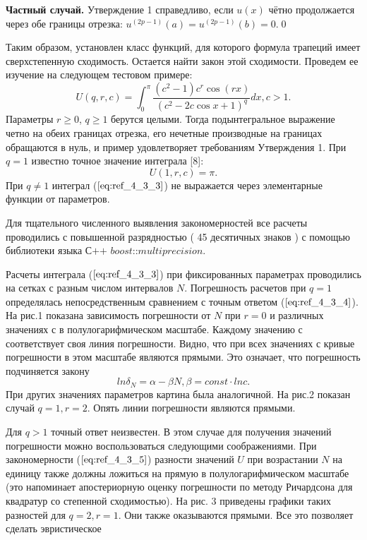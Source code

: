 \textbf{Частный случай.} Утверждение 1 справедливо, если $u(x)$ чётно
продолжается через обе границы отрезка: $u^{(2p-1)}(a)=u^{(2p-1)}(b)=0$.\qed

Таким образом, установлен класс функций, для которого формула
трапеций имеет сверхстепенную сходимость. Остается найти закон этой
сходимости. Проведем ее изучение на следующем тестовом примере:
\begin{equation}
U(q,r,c) = \int_0^{\pi} \frac{(c^2-1)c^r\cos (rx)}{(c^2-2c\cos x+1)^q}dx,c>1.
\label{eq:ref_4_3_3}
\end{equation}
Параметры $r \geqslant 0$, $q \geqslant 1$ берутся целыми. Тогда подынтегральное выражение
четно на обеих границах отрезка, его нечетные производные на границах
обращаются в нуль, и пример удовлетворяет требованиям Утверждения 1. При
$q = 1$ известно точное значение интеграла [8]:
\begin{equation}
U(1,r,c) = \pi.
\label{eq:ref_4_3_4}
\end{equation}
При $q \ne 1$ интеграл ($\ref{eq:ref_4_3_3}$) не выражается через элементарные функции от
параметров.

Для тщательного численного выявления закономерностей все расчеты
проводились с повышенной разрядностью ( 45 десятичных знаков ) с помощью
библиотеки языка $\textit{С++ boost::multiprecision}$.

Расчеты интеграла ($\ref{eq:ref_4_3_3}$) при фиксированных параметрах проводились на
сетках с разным числом интервалов $N$. Погрешность расчетов при $q =1$
определялась непосредственным сравнением с точным ответом ($\ref{eq:ref_4_3_4}$). На рис.1
показана зависимость погрешности от $N$ при $r = 0$ и различных значениях с в
полулогарифмическом масштабе. Каждому значению с соответствует своя
линия погрешности. Видно, что при всех значениях с кривые погрешности в
этом масштабе являются прямыми. Это означает, что погрешность подчиняется
закону
\begin{equation}
ln \delta_N = \alpha - \beta N, \beta = const \cdot lnc.
\label{eq:ref_4_3_5}
\end{equation}
При других значениях параметров картина была аналогичной. На рис.2 показан
случай $q =1,r = 2$. Опять линии погрешности являются прямыми.

Для $q >1$ точный ответ неизвестен. В этом случае для получения значений
погрешности можно воспользоваться следующими соображениями. При
закономерности ($\ref{eq:ref_4_3_5}$) разности значений $U$ при возрастании $N$ на единицу
также должны ложиться на прямую в полулогарифмическом масштабе (это
напоминает апостериорную оценку погрешности по методу Ричардсона для
квадратур со степенной сходимостью). На рис. 3 приведены графики таких
разностей для $q = 2,r = 1$. Они также оказываются прямыми. Все это позволяет
сделать эвристическое

